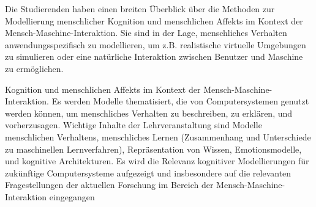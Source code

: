 \begin{module}
\begin{learningoutcomes}
Die Studierenden haben einen breiten Überblick über die Methoden zur Modellierung menschlicher Kognition und menschlichen Affekts im Kontext der Mensch-Maschine-Interaktion. Sie sind in der Lage, menschliches Verhalten anwendungsspezifisch zu modellieren, um z.B. realistische virtuelle Umgebungen zu simulieren oder eine natürliche Interaktion zwischen Benutzer und Maschine zu ermöglichen.


\end{learningoutcomes}

\begin{content}
Kognition und menschlichen Affekts im Kontext der Mensch-Maschine-Interaktion. Es werden Modelle thematisiert, die von Computersystemen genutzt werden können, um menschliches Verhalten zu beschreiben, zu erklären, und vorherzusagen. \newline
\newline
 Wichtige Inhalte der Lehrveranstaltung sind Modelle menschlichen Verhaltens, menschliches Lernen (Zusammenhang und Unterschiede zu maschinellen Lernverfahren), Repräsentation von Wissen, Emotionsmodelle, und kognitive Architekturen. Es wird die Relevanz kognitiver Modellierungen für zukünftige Computersysteme aufgezeigt und insbesondere auf die relevanten Fragestellungen der aktuellen Forschung im Bereich der Mensch-Maschine-Interaktion eingegangen


\end{content}



\end{module}

